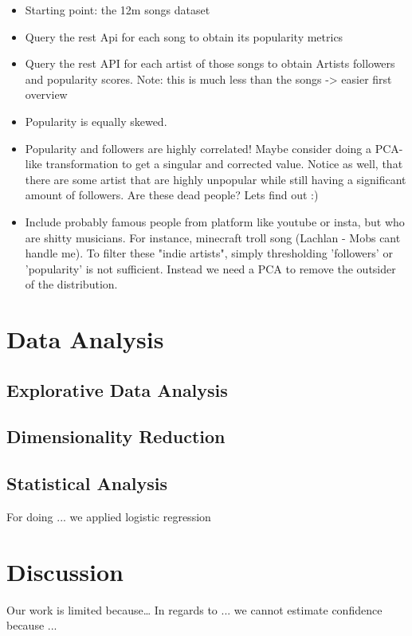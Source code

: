 \documentclass{article}
\begin{document}
\begin{itemize}
  \item Starting point: the 12m songs dataset
  \item Query the rest Api for each song to obtain its popularity metrics
  \item Query the rest API for each artist of those songs to obtain Artists followers and popularity scores. Note: this is much less than the songs -> easier first overview
  \item Popularity is equally skewed.
  \item Popularity and followers are highly correlated! Maybe consider doing a PCA-like transformation to get a singular and corrected value. Notice as well, that there are some artist that are highly unpopular while still having a significant amount of followers. Are these dead people? Lets find out :)
  \item Include probably famous people from platform like youtube or insta, but who are shitty musicians. For instance, minecraft troll song (Lachlan - Mobs cant handle me).
  To filter these "indie artists", simply thresholding 'followers' or 'popularity' is not sufficient. Instead we need a PCA to remove the outsider of the distribution.
\end{itemize}

\section{Data Analysis}

\subsection{Explorative Data Analysis}

\subsection{Dimensionality Reduction}

\subsection{Statistical Analysis}
For doing ... we applied logistic regression

\section{Discussion}
Our work is limited because\dots
In regards to ... we cannot estimate confidence because ...
\end{document}
